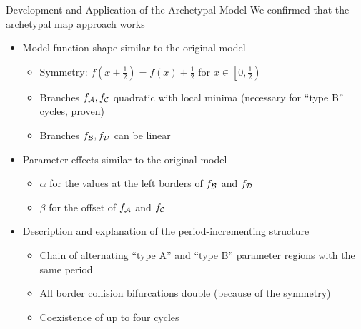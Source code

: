\begin{frame}{Development and Application of the Archetypal Model}
	\vspace{-1em}
	We confirmed that the archetypal map approach works
	\vspace{1em}
	\pause
	\begin{itemize}
		\item Model function shape similar to the original model
		      \begin{itemize}
			      \item Symmetry: $f\left(x + \frac{1}{2}\right) = f(x) + \frac{1}{2}$ for $x \in \left[0, \frac{1}{2}\right)$
			      \item Branches $f_{\mathcal{A}}, f_{\mathcal{C}}$ quadratic with local minima (necessary for ``type B'' cycles, proven)
			      \item Branches $f_{\mathcal{B}}, f_{\mathcal{D}}$ can be linear
		      \end{itemize}
		      \pause
		\item Parameter effects similar to the original model
		      \begin{itemize}
			      \item $\alpha$ for the values at the left borders of $f_{\mathcal{B}}$ and $f_{\mathcal{D}}$
			      \item $\beta$ for the offset of $f_{\mathcal{A}}$ and $f_{\mathcal{C}}$
		      \end{itemize}
		      \pause
		\item Description and explanation of the period-incrementing structure
		      \begin{itemize}
			      \item Chain of alternating ``type A'' and ``type B'' parameter regions with the same period
			      \item All border collision bifurcations double (because of the symmetry)
			      \item Coexistence of up to four cycles
		      \end{itemize}
	\end{itemize}
\end{frame}
